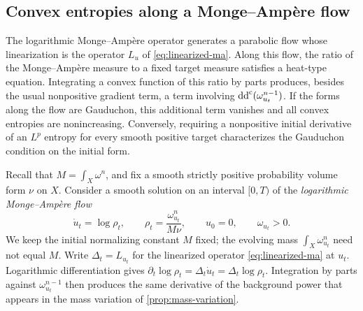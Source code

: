 \subsection{Convex entropies along a Monge--Amp\`ere flow}
\label{subsec:hermitian-parabolic-entropy}

The logarithmic Monge--Amp\`ere operator generates a parabolic flow whose linearization is the operator $L_u$ of \eqref{eq:linearized-ma}. Along this flow, the ratio of the Monge--Amp\`ere measure to a fixed target measure satisfies a heat-type equation. Integrating a convex function of this ratio by parts produces, besides the usual nonpositive gradient term, a term involving $\mathrm{dd}^{\mathrm{c}}(\omega_{u_t}^{n-1})$. If the forms along the flow are Gauduchon, this additional term vanishes and all convex entropies are nonincreasing. Conversely, requiring a nonpositive initial derivative of an $L^p$ entropy for every smooth positive target characterizes the Gauduchon condition on the initial form.

Recall that $M=\int_X\omega^n$, and fix a smooth strictly positive probability volume form $\nu$ on $X$. Consider a smooth solution on an interval $[0,T)$ of the \emph{logarithmic Monge--Amp\`ere flow}
\begin{equation}\label{eq:hermitian-parabolic-entropy-flow}
 \dot u_t=\log\rho_t,\qquad
 \rho_t=\frac{\omega_{u_t}^n}{M\nu},\qquad
 u_0=0,\qquad \omega_{u_t}>0.
\end{equation}
We keep the initial normalizing constant $M$ fixed; the evolving mass $\int_X\omega_{u_t}^n$ need not equal $M$. Write $\Delta_t=L_{u_t}$ for the linearized operator \eqref{eq:linearized-ma} at $u_t$. Logarithmic differentiation gives $\partial_t\log\rho_t=\Delta_t\dot u_t=\Delta_t\log\rho_t$. Integration by parts against $\omega_{u_t}^{n-1}$ then produces the same derivative of the background power that appears in the mass variation of \cref{prop:mass-variation}.

